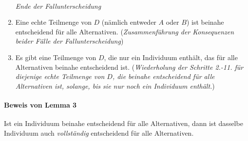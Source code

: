 \begin{enumerate}
  ~\\{\em Ende der Fallunterscheidung}

  \item Eine echte Teilmenge von $D$ (nämlich entweder $A$ oder $B$) ist beinahe
  entscheidend für alle Alternativen. ({\em Zusammenführung der Konsequenzen
  beider Fälle der Fallunterscheidung})
   
  \item Es gibt eine Teilmenge von $D$, die nur ein Individuum enthält, das für
  alle Alternativen beinahe entscheidend ist. ({\em Wiederholung der Schritte
  2.-11. für diejenige echte Teilmenge von $D$, die beinahe entscheidend für alle
  Alternativen ist, solange, bis sie nur noch ein Individuum enthält.})
\end{enumerate}


\paragraph{Beweis von Lemma 3} Ist ein Individuum beinahe entscheidend für
  alle Alternativen, dann ist dasselbe Individuum auch {\em vollständig} entscheidend
  für alle Alternativen.
  
